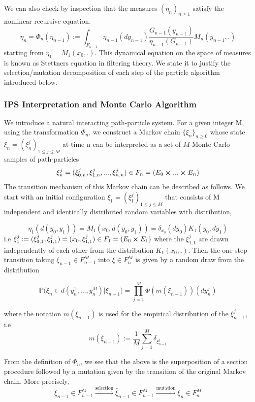 We can also check by inspection that the measures $(\eta_n)_{n\geq 1}$ satisfy the nonlinear recursive equation.
$$\eta_n = \varPhi_n(\eta_{n-1}) := \int_{F_{n-1}} \eta_{n-1}(dy_{n-1}) \frac{G_{n-1}(y_{n-1})}{\eta_{n-1}(G_{n-1})} M_n(y_{n-1},.)$$
starting from $\eta_1 = M_1(x_0,.)$. This dynamical equation on the space of measures is known as Stettners equation in filtering theory. We state it to justify the selection/mutation decomposition of each step of the particle algorithm introduced below.


\subsubsection{IPS Interpretation and Monte Carlo Algorithm}
We introduce a natural interacting path-particle system. For a given integer M, using the transformation $\varPhi_n$, we construct a Markov chain $\{\xi_n\}_{n\geq 0}$ whose state $\xi_n = (\xi_n^j)_{1\leq j \leq M}$ at time n can be interpreted as a set of $M$ Monte Carlo samples of path-particles 
$$\xi_n^j = (\xi_{0,n}^j, \xi_{1,n}^j,..., \xi_{n,n}^j) \in F_n = (E_0 \cross ... \cross E_n)$$
The transition mechanism of this Markov chain can be described as follows. We start with an initial configuration $\xi_1 = (\xi_1^j)_{1\leq j \leq M}$ that consists of M independent and identically distributed random variables with distribution,

$$\eta_1(d(y_0,y_1)) = M_1(x_0,d(y_0,y_1)) = \delta_{x_0}(dy_0)K_1(y_0, dy_1) $$
i.e $\xi_1^j := (\xi_{0,1}^j,\xi_{1,1}^j) = (x_0, \xi_{1,1}^j) \in F_1 = (E_0 \cross E_1)$ where the $\xi_{1,1}^j$ are drawn independently of each other from the distribution $K_1(x_0,.)$. Then the one-step transition taking $\xi_{n-1} \in F_{n-1}^M$ into $\xi \in F_n^M$ is given by a random draw from the distribution

\begin{equation}
	\mathbb{P}\big( \xi_n \in d(y_n^1,...,y_n^M)|\xi_{n-1}  \big) = \prod_{j=1}^{M}\varPhi(m(\xi_{n-1}))(dy_n^j)
\end{equation}

where the notation $m(\xi_{n-1})$ is used for the empirical distribution of the $\xi_{n-1}^j$, i.e
$$m(\xi_{n-1}) := \frac{1}{M}\sum_{j=1}^{M}\delta_{\xi_{n-1}^{j}}$$

From the definition of $\varPhi_n$, we see that the above is the superposition of a section procedure followed by a mutation given by the transition of the original Markov chain. More precisely,
$$\xi_{n-1} \in F_{n-1}^{M}  \xrightarrow{\text{selection}} \hat{\xi}_{n-1} \in F_{n-1}^M \xrightarrow{\text{mutation}} \xi_n \in F_n^M$$

